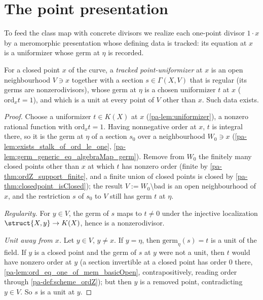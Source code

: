 \section{The point presentation}

To feed the class map with concrete divisors we realize each one-point divisor \(1 \cdot x\) by a
meromorphic presentation whose defining data is tracked: its equation at \(x\) is a uniformizer
whose germ at \(\eta\) is recorded.

\begin{lemma}
  \label{pa-lem:pointUniformizerData}
  \leanok

  For a closed point \(x\) of the curve, a \emph{tracked point-uniformizer} at \(x\) is an open
  neighbourhood \(V \ni x\) together with a section \(s \in \Gamma(X,V)\) that is regular (its
  germs are nonzerodivisors), whose germ at \(\eta\) is a chosen uniformizer \(t\) at \(x\)
  (\(\mathrm{ord}_x t = 1\)), and which is a unit at every point of \(V\) other than \(x\). Such
  data exists.
\end{lemma}
\begin{proof}
  \leanok
  Choose a uniformizer \(t \in K(X)\) at \(x\) (\ref{pa-lem:uniformizer}), a nonzero rational function
  with \(\mathrm{ord}_x t = 1\). Having nonnegative order at \(x\), \(t\) is integral there, so it
  is the germ at \(\eta\) of a section \(s_0\) over a neighbourhood \(W_0 \ni x\)
  (\ref{pa-lem:exists_stalk_of_ord_le_one}, \ref{pa-lem:germ_generic_eq_algebraMap_germ}). Remove from
  \(W_0\) the finitely many closed points other than \(x\) at which \(t\) has nonzero order
  (finite by \ref{pa-thm:ordZ_support_finite}, and a finite union of closed points is closed by
  \ref{pa-thm:closedpoint_isClosed}); the result \(V := W_0 \setminus \mathrm{bad}\) is an open
  neighbourhood of \(x\), and the restriction \(s\) of \(s_0\) to \(V\) still has germ \(t\) at
  \(\eta\).

  \emph{Regularity.} For \(y \in V\), the germ of \(s\) maps to \(t \neq 0\) under the injective
  localization \(\struct{X,y} \to K(X)\), hence is a nonzerodivisor.

  \emph{Unit away from \(x\).} Let \(y \in V\), \(y \neq x\). If \(y = \eta\), then
  \(\mathrm{germ}_\eta(s) = t\) is a unit of the field. If \(y\) is a closed point and the germ of
  \(s\) at \(y\) were not a unit, then \(t\) would have nonzero order at \(y\) (a section invertible
  at a closed point has order \(0\) there, \ref{pa-lem:ord_eq_one_of_mem_basicOpen}, contrapositively,
  reading order through \ref{pa-def:scheme_ordZ}); but then \(y\) is a removed point, contradicting
  \(y \in V\). So \(s\) is a unit at \(y\).
\end{proof}

